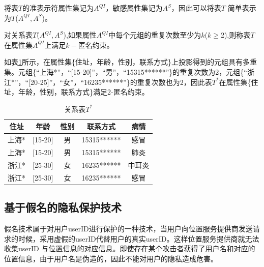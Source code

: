 将表$T$的准表示符属性集记为$A^{QI}$，敏感属性集记为$A^S$，因此可以将表$T$ 简单表示为$T$($A^{QI},A^S$)。

\begin{define}[k-匿名约束]
对关系表$T$($A^{QI},A^S$),如果属性$A^{QI}$中每个元组的重复次数至少为$k$($k\geq$2),则称表$T$在属性集$A^{QI}$上满足$k-$匿名约束。
\end{define}

如表\ref{k-anony-2}所示，在属性集\{住址，年龄，性别，联系方式\}上投影得到的元组具有多重集。元组\{“上海*”，“[15-20]”，“男”，“15315******”\}的重复次数为2，元组\{“浙江*”，“[20-25]”，“女”，“16235******”\}的重复次数也为2，因此表$T^*$在属性集\{住址，年龄，性别，联系方式\}满足2-匿名约束。
\begin{table}[H]
\centering  %
\begin{tabular}{ccccc}  %
\hline
住址 &年龄&性别 &联系方式&病情\\ \hline  %
上海*&[15-20]&男 &15315****** &感冒\\         %
上海*&[15-20]&男 &15315****** &肺炎\\        %
浙江*&[25-30]&女 &16235****** &中耳炎\\
浙江*&[25-30]&女 &16235****** &感冒\\ \hline
\end{tabular}
\caption{关系表$T^*$}\label{k-anony-2}
\end{table}
\subsection{基于假名的隐私保护技术}
假名技术属于对用户userID进行保护的一种技术，当用户向位置服务提供商发送请求的时候，采用虚假的userID代替用户的真实userID。这样位置服务提供商就无法收集userID 与位置信息的对应信息。即使存在某个攻击者获得了用户名和对应的位置信息，由于用户名是伪造的，因此不能对用户的隐私造成危害。

